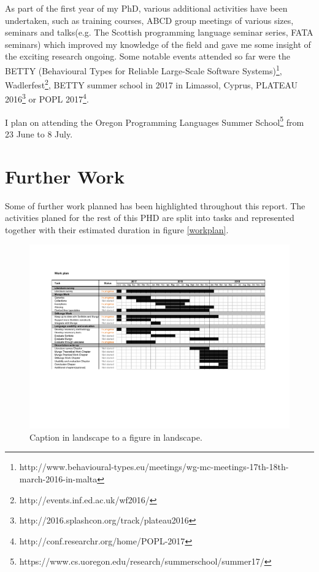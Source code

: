 As part of the first year of my PhD, various additional activities have been undertaken, such as training courses, ABCD group meetings of various sizes, seminars and talks(e.g. The Scottish programming language seminar series, FATA seminars) which improved my knowledge of the field and gave me some insight of the exciting research ongoing. Some notable events attended so far were the BETTY (Behavioural Types for Reliable Large-Scale Software Systems)\footnote{http://www.behavioural-types.eu/meetings/wg-mc-meetings-17th-18th-march-2016-in-malta}, Wadlerfest\footnote{http://events.inf.ed.ac.uk/wf2016/}, BETTY summer school in 2017 in Limassol, Cyprus, PLATEAU 2016\footnote{http://2016.splashcon.org/track/plateau2016} or POPL 2017\footnote{http://conf.researchr.org/home/POPL-2017}.

I plan on attending the Oregon Programming Languages Summer School\footnote{https://www.cs.uoregon.edu/research/summerschool/summer17/} from 23 June to 8 July.
\section{Further Work}
\label{future}

Some of further work planned has been highlighted throughout this report.
The activities planed for the rest of this PHD are split into tasks and represented together with their estimated duration in figure \ref{workplan}.

\begin{figure}
  \label{workplan}
    \includegraphics[height=0.9\vsize, width=1.1\hsize]{workplan.pdf}

    \caption{Caption in landscape to a figure in landscape.}
   \label{fig:LandscapeFigure}
\end{figure}
